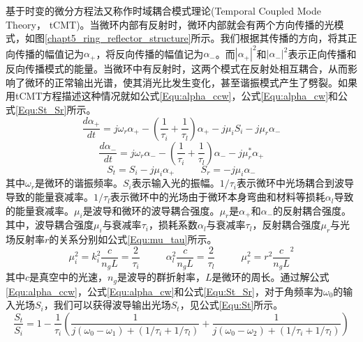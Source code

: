 基于时变的微分方程法又称作时域耦合模式理论(Temporal Coupled Mode Theory， tCMT)。当微环内部有反射时，微环内部就会有两个方向传播的光模式，如图\ref{chapt5_ring_reflector_structure}所示。我们根据其传播的方向，将其正向传播的幅值记为$\alpha_+$，将反向传播的幅值记为$\alpha_-$。而$|\alpha_+|^2$和$|\alpha_-|^2$表示正向传播和反向传播模式的能量。当微环中有反射时，这两个模式在反射处相互耦合，从而影响了微环的正常输出光谱，使其消光比发生变化，甚至谐振模式产生了劈裂。如果用tCMT方程描述这种情况就如公式\ref{Equ:alpha_ccw}，公式\ref{Equ:alpha_cw}和公式\ref{Equ:St_Sr}所示\cite{Li2016design}。
\begin{equation}
\label{Equ:alpha_ccw}
\frac{d\alpha_+}{dt}=j\omega_r\alpha_+-\left(\frac{1}{\tau_i}+\frac{1}{\tau_l}\right)\alpha_+-j\mu_iS_i-j\mu_r\alpha_-
\end{equation}
\begin{equation}
\label{Equ:alpha_cw}
\frac{d\alpha_-}{dt}=j\omega_r\alpha_--\left(\frac{1}{\tau_i}+\frac{1}{\tau_l}\right)\alpha_--j\mu_r^*\alpha_+
\end{equation}
\begin{equation}
\label{Equ:St_Sr}
S_t = S_i-j\mu_i\alpha_+ ~~~~~~~~~~~~ S_r = -j\mu_i\alpha_-
\end{equation}
其中$\omega_r$是微环的谐振频率。$S_i$表示输入光的振幅。$1/\tau_i$表示微环中光场耦合到波导导致的能量衰减率。$1/\tau_l$表示微环中的光场由于微环本身弯曲和材料等损耗$\alpha_l$导致的能量衰减率。$\mu_i$是波导和微环的波导耦合强度。$\mu_r$是$\alpha_+$和$\alpha_-$的反射耦合强度。其中，波导耦合强度$\mu_i$与衰减率$\tau_i$，损耗系数$\alpha_l$与衰减率$\tau_l$，反射耦合强度$\mu_r$与光场反射率$r$的关系分别如公式\ref{Equ:mu_tau}所示\cite{little1997microring}。
\begin{equation}
\label{Equ:mu_tau}
\mu_i^2=k_i^2\frac{c}{n_gL}=\frac{2}{\tau_i}~~~~~~~~~~~~\alpha_l^2\frac{c}{n_gL}=\frac{2}{\tau_l}~~~~~~~~~~~~\mu_r^2=r^2\frac{c}{n_gL}^2
\end{equation}
其中$c$是真空中的光速，$n_g$是波导的群折射率，$L$是微环的周长。通过解公式\ref{Equ:alpha_ccw}，公式\ref{Equ:alpha_cw}和公式\ref{Equ:St_Sr}，对于角频率为$\omega_0$的输入光场$S_i$，我们可以获得波导输出光场$S_t$，见公式\ref{Equ:St}所示。
\begin{equation}
\label{Equ:St}
\frac{S_t}{S_i}=1-\frac{1}{\tau_i}\left(\frac{1}{j(\omega_0-\omega_1)+(1/\tau_i+1/\tau_l)} + \frac{1}{j(\omega_0-\omega_2)+(1/\tau_i+1/\tau_l)}\right)
\end{equation}


